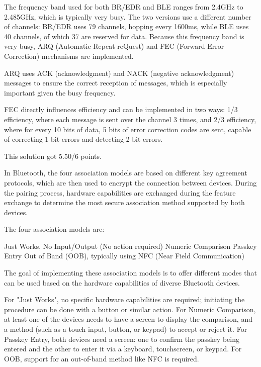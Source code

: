 \begin{solution}
    The frequency band used for both BR/EDR and BLE ranges from 2.4GHz to 2.485GHz, which is typically very busy. The two versions use a different number of channels: BR/EDR uses 79 channels, hopping every 1600ms, while BLE uses 40 channels, of which 37 are reserved for data. Because this frequency band is very busy, ARQ (Automatic Repeat reQuest) and FEC (Forward Error Correction) mechanisms are implemented.

    ARQ uses ACK (acknowledgment) and NACK (negative acknowledgment) messages to ensure the correct reception of messages, which is especially important given the busy frequency.

    FEC directly influences efficiency and can be implemented in two ways: 1/3 efficiency, where each message is sent over the channel 3 times, and 2/3 efficiency, where for every 10 bits of data, 5 bits of error correction codes are sent, capable of correcting 1-bit errors and detecting 2-bit errors.
\end{solution}


\begin{solution}
    This solution got 5.50/6 points.

    In Bluetooth, the four association models are based on different key agreement protocols, which are then used to encrypt the connection between devices. During the pairing process, hardware capabilities are exchanged during the feature exchange to determine the most secure association method supported by both devices.

    The four association models are:

    Just Works, No Input/Output (No action required)
    Numeric Comparison
    Passkey Entry
    Out of Band (OOB), typically using NFC (Near Field Communication)

    The goal of implementing these association models is to offer different modes that can be used based on the hardware capabilities of diverse Bluetooth devices.

    For "Just Works", no specific hardware capabilities are required; initiating the procedure can be done with a button or similar action. For Numeric Comparison, at least one of the devices needs to have a screen to display the comparison, and a method (such as a touch input, button, or keypad) to accept or reject it. For Passkey Entry, both devices need a screen: one to confirm the passkey being entered and the other to enter it via a keyboard, touchscreen, or keypad. For OOB, support for an out-of-band method like NFC is required.
\end{solution}


